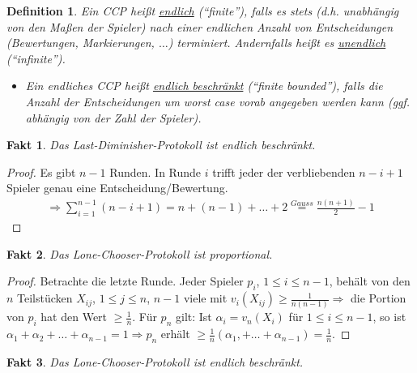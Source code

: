\documentclass[a4paper,10pt]{scrartcl}
\newtheorem*{definition}{Definition}
\newtheorem*{fakt}{Fakt}
\begin{document}
\begin{definition}
 Ein CCP heißt \underline{endlich} (``finite''), falls es stets (d.h. unabhängig von den Maßen der Spieler) nach einer endlichen Anzahl
 von Entscheidungen (Bewertungen, Markierungen, $\ldots$) terminiert. Andernfalls heißt es \underline{unendlich} (``infinite'').
 \begin{itemize}
  \item Ein endliches CCP heißt \underline{endlich beschränkt} (``finite bounded''), falls die Anzahl der Entscheidungen um worst case vorab
        angegeben werden kann (ggf. abhängig von der Zahl der Spieler).
 \end{itemize}
\end{definition}
\begin{fakt}
 Das Last-Diminisher-Protokoll ist endlich beschränkt.
\end{fakt}
\begin{proof}
 Es gibt $n-1$ Runden. In Runde $i$ trifft jeder der verbliebenden $n-i+1$ Spieler genau eine Entscheidung/Bewertung. 
 \begin{align*}
  \Rightarrow \sum\limits_{i=1}^{n-1}(n-i+1)=n+(n-1)+\ldots+2\stackrel{Gauss}{=}\frac{n(n+1)}{2}-1
 \end{align*}

\end{proof}
\begin{fakt}
 Das Lone-Chooser-Protokoll ist proportional.
\end{fakt}
\begin{proof}
 Betrachte die letzte Runde. Jeder Spieler $p_i$, $1\leq i\leq n-1$, behält von den $n$ Teilstücken $X_{ij}$, $1\leq j\leq n$, $n-1$
 viele mit
 $v_i(X_{ij})\geq\frac{1}{n(n-1)} \Rightarrow$ die Portion von $p_i$ hat den Wert $\geq\frac{1}{n}$. Für $p_n$ gilt: Ist $\alpha_i =
 v_n(X_i)$ für $1\leq i\leq n-1$, so ist $\alpha_1+\alpha_2+\ldots+\alpha_{n-1}=1 \Rightarrow p_n$ erhält $\geq\frac{1}{n}(\alpha_1,
 +\ldots+\alpha_{n-1})=\frac{1}{n}.$ 
\end{proof}
\begin{fakt}
 Das Lone-Chooser-Protokoll ist endlich beschränkt.
\end{fakt}
\end{document}
